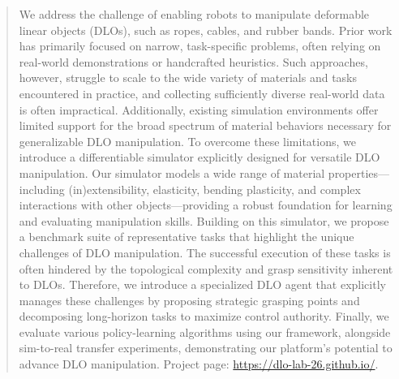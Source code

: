 \documentclass{article}
\theoremstyle{plain}
\theoremstyle{definition}
\theoremstyle{remark}
\begin{document}
\begin{abstract}
We address the challenge of enabling robots to manipulate deformable linear objects (DLOs), such as ropes, cables, and rubber bands. Prior work has primarily focused on narrow, task-specific problems, often relying on real-world demonstrations or handcrafted heuristics. Such approaches, however, struggle to scale to the wide variety of materials and tasks encountered in practice, and collecting sufficiently diverse real-world data is often impractical. Additionally, existing simulation environments offer limited support for the broad spectrum of material behaviors necessary for generalizable DLO manipulation.
To overcome these limitations, we introduce a differentiable simulator explicitly designed for versatile DLO manipulation. Our simulator models a wide range of material properties—including (in)extensibility,  elasticity, bending plasticity, and complex interactions with other objects—providing a robust foundation for learning and evaluating manipulation skills. Building on this simulator, we propose a benchmark suite of representative tasks that highlight the unique challenges of DLO manipulation. The successful execution of these tasks is often hindered by the topological complexity and grasp sensitivity inherent to DLOs. Therefore, we introduce a specialized DLO agent that explicitly manages these challenges by proposing strategic grasping points and decomposing long-horizon tasks to maximize control authority. Finally, we evaluate various policy-learning algorithms using our framework, alongside sim-to-real transfer experiments, demonstrating our platform's potential to advance DLO manipulation. Project page: \url{https://dlo-lab-26.github.io/}.
\end{abstract}









\end{document}
